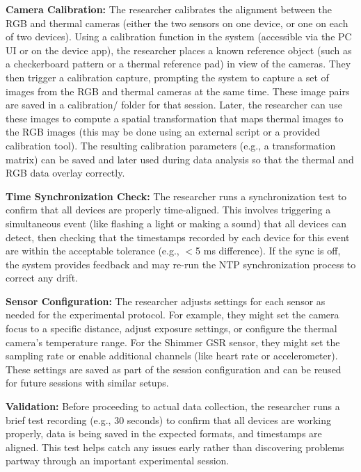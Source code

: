\textbf{Camera Calibration:} The researcher calibrates the alignment between the RGB and thermal cameras (either the two sensors on one device, or one on each of two devices). Using a calibration function in the system (accessible via the PC UI or on the device app), the researcher places a known reference object (such as a checkerboard pattern or a thermal reference pad) in view of the cameras. They then trigger a calibration capture, prompting the system to capture a set of images from the RGB and thermal cameras at the same time. These image pairs are saved in a calibration/ folder for that session. Later, the researcher can use these images to compute a spatial transformation that maps thermal images to the RGB images (this may be done using an external script or a provided calibration tool). The resulting calibration parameters (e.g., a transformation matrix) can be saved and later used during data analysis so that the thermal and RGB data overlay correctly.

\textbf{Time Synchronization Check:} The researcher runs a synchronization test to confirm that all devices are properly time-aligned. This involves triggering a simultaneous event (like flashing a light or making a sound) that all devices can detect, then checking that the timestamps recorded by each device for this event are within the acceptable tolerance (e.g., $<$5 ms difference). If the sync is off, the system provides feedback and may re-run the NTP synchronization process to correct any drift.

\textbf{Sensor Configuration:} The researcher adjusts settings for each sensor as needed for the experimental protocol. For example, they might set the camera focus to a specific distance, adjust exposure settings, or configure the thermal camera's temperature range. For the Shimmer GSR sensor, they might set the sampling rate or enable additional channels (like heart rate or accelerometer). These settings are saved as part of the session configuration and can be reused for future sessions with similar setups.

\textbf{Validation:} Before proceeding to actual data collection, the researcher runs a brief test recording (e.g., 30 seconds) to confirm that all devices are working properly, data is being saved in the expected formats, and timestamps are aligned. This test helps catch any issues early rather than discovering problems partway through an important experimental session.